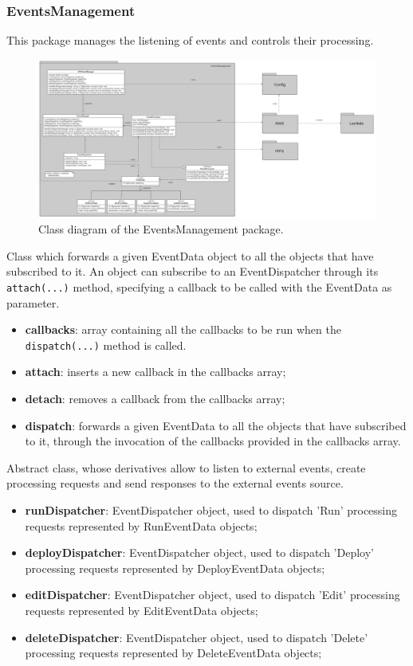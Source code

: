	\subsubsection{EventsManagement}
	This package manages the listening of events and controls their processing.
	\begin{figure} [h!]
		\centering
		\includegraphics[width=1.1\linewidth]{diagrammi/etherless-server/Eventsmanager}
		\caption{Class diagram of the EventsManagement package.}
	\end{figure}
	Class which forwards a given EventData object to all the objects that have subscribed to it. An object can subscribe to an EventDispatcher through its \texttt{attach(...)} method, specifying a callback to be called with the EventData as parameter.
	\begin{itemize}
		\item \textbf{callbacks}: array containing all the callbacks to be run when the \texttt{dispatch(...)} method is called.
	\end{itemize}
	\begin{itemize}
		\item \textbf{attach}: inserts a new callback in the callbacks array;
		\item \textbf{detach}: removes a callback from the callbacks array;
		\item \textbf{dispatch}: forwards a given EventData to all the objects that have subscribed to it, through the invocation of the callbacks provided in the callbacks array.
	\end{itemize}
	Abstract class, whose derivatives allow to listen to external events, create processing requests and send responses to the external events source.
	\begin{itemize}
		\item \textbf{runDispatcher}: EventDispatcher object, used to dispatch 'Run' processing requests represented by RunEventData objects;
		\item \textbf{deployDispatcher}: EventDispatcher object, used to dispatch 'Deploy' processing requests represented by DeployEventData objects;
		\item \textbf{editDispatcher}: EventDispatcher object, used to dispatch 'Edit' processing requests represented by EditEventData objects;
		\item \textbf{deleteDispatcher}: EventDispatcher object, used to dispatch 'Delete' processing requests represented by DeleteEventData objects;
	\end{itemize}
